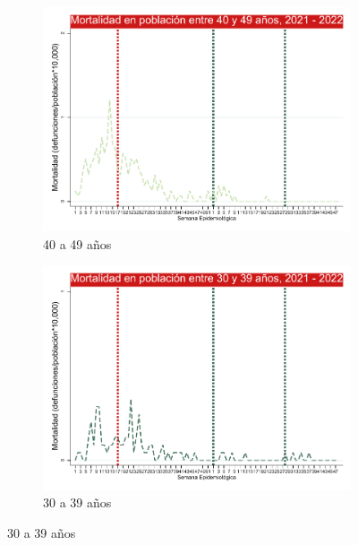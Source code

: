 \documentclass[12pt,a4paper,openany]{book}
\begin{document}
\begin{figure}[h]
		\vspace{10mm}
		\begin{subfigure}[b]{0.45\textwidth}
			\centering
			\includegraphics[width=\textwidth]{../figuras/mortalidad_edad_40.pdf}
			\caption{40 a 49 años}
		\end{subfigure}
		\hfill
		\begin{subfigure}[b]{0.45\textwidth}
			\centering
			\includegraphics[width=\textwidth]{../figuras/mortalidad_edad_30.pdf}
			\caption{30 a 39 años}
		\end{subfigure}
	\end{figure}
	
\end{document}

